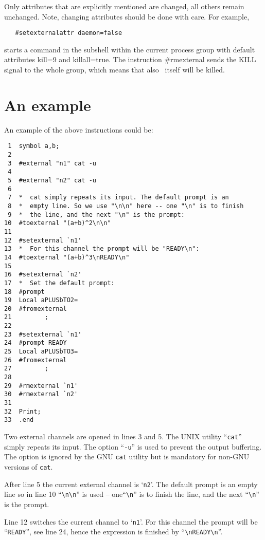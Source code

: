 Only attributes that are explicitly mentioned are changed, all others remain 
unchanged. Note, changing attributes should be done with care. For example,
\begin{verbatim}
   #setexternalattr daemon=false
\end{verbatim}
starts a command in the subshell within the current process group with
default attributes kill=9 and killall=true.
The instruction \#rmexternal sends the
KILL signal to the whole group, which means that also 
\FORM\ itself will be killed.


\section{An example}
 
An example of the above instructions could be:
\begin{verbatim}
 1  symbol a,b;
 2
 3  #external "n1" cat -u
 4
 5  #external "n2" cat -u
 6
 7  *  cat simply repeats its input. The default prompt is an
 8  *  empty line. So we use "\n\n" here -- one "\n" is to finish
 9  *  the line, and the next "\n" is the prompt:
10  #toexternal "(a+b)^2\n\n"
11
12  #setexternal `n1'
13  *  For this channel the prompt will be "READY\n":
14  #toexternal "(a+b)^3\nREADY\n"
15
16  #setexternal `n2'
17  *  Set the default prompt:
18  #prompt
19  Local aPLUSbTO2=
20  #fromexternal
21         ;
22
23  #setexternal `n1'
24  #prompt READY
25  Local aPLUSbTO3=
26  #fromexternal
27         ;
28
29  #rmexternal `n1'
30  #rmexternal `n2'
31
32  Print;
33  .end
\end{verbatim}

Two external channels are opened in lines 3 and 5. The UNIX 
utility ``\verb|cat|'' simply repeats its input.
The option ``\verb|-u|'' is used to prevent the output buffering. The 
option is ignored by the GNU \verb|cat| utility but is mandatory 
for non-GNU versions of \verb|cat|.

After line 5 the current external channel is `\verb|n2|'. The default 
prompt is an empty line so in line 10 ``\verb|\n\n|'' is used -- 
one``\verb|\n|'' is to finish the line, and the next ``\verb|\n|'' is the 
prompt.

Line 12 switches the current channel to `\verb|n1|'. For this channel
the prompt will be ``\verb|READY|'', see line 24, hence the expression is
finished by ``\verb|\nREADY\n|''.

